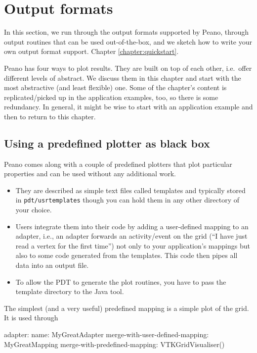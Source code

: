 \section{Output formats}


\chapterDescription
  {
    In this section, we run through the output formats supported by Peano,
    through output routines that can be used out-of-the-box, and we sketch how
    to write your own output format support. 
  } { Chapter
    \ref{chapter:quickstart}.
  }

Peano has four ways to plot results. 
They are built on top of each other, i.e.~offer different levels of abstract.
We discuss them in this chapter and start with the most abstractive (and least
flexible) one.
Some of the chapter's content is
    replicated/picked up in the application examples, too, so there is some
    redundancy. In general, it might be wise to start with an application
    example and then to return to this chapter.
    
    
\subsection{Using a predefined plotter as black box}

Peano comes along with a couple of predefined plotters that plot particular
properties and can be used without any additional work. 

\begin{itemize}
  \item They are described as simple text files called templates and typically
  stored in \texttt{pdt/usrtemplates} though you can hold them in any other
  directory of your choice.
  \item Users integrate them into their code by adding a user-defined mapping to
  an adapter, i.e., an adapter forwards an activity/event on the grid (``I have
  just read a vertex for the first time'') not only to your application's
  mappings but also to some code generated from the templates. This code then
  pipes all data into an output file.
  \item To allow the PDT to generate the plot routines, you have to pass the
  template directory to the Java tool.
\end{itemize}

\noindent
The simplest (and a very useful) predefined mapping is a simple plot of the
grid. It is used through
\begin{code}
adapter:
  name: MyGreatAdapter
  merge-with-user-defined-mapping: MyGreatMapping
  merge-with-predefined-mapping: VTKGridVisualiser()
\end{code}

